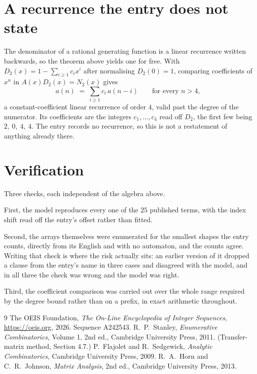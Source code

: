 \documentclass[11pt,a4paper]{article}
\theoremstyle{plain}
\theoremstyle{definition}
\begin{document}
\section{A recurrence the entry does not state}

The denominator of a rational generating function is a linear recurrence written backwards, so
the theorem above yields one for free. With $D_2(x)=1-\sum_{i\ge1}c_ix^i$ after normalising
$D_2(0)=1$, comparing coefficients of $x^n$ in $A(x)D_2(x)=N_2(x)$ gives
\[
a(n)\;=\;\sum_{i\ge1}c_i\,a(n-i)\qquad\text{for every }n>4,
\]
a constant-coefficient linear recurrence of order $4$, valid past the degree of the
numerator. Its coefficients are the integers $c_1,\dots,c_{4}$ read off $D_2$, the first few being $2,\ 0,\ 4,\ 4$. The entry records no recurrence, so this is not a restatement of anything
already there.

\section{Verification}

Three checks, each independent of the algebra above.

First, the model reproduces every one of the $25$ published terms, with the index shift
read off the entry's offset rather than fitted.

Second, the arrays themselves were enumerated for the smallest shapes the entry counts,
directly from its English and with no automaton, and the counts agree. Writing that check is
where the risk actually sits: an earlier version of it dropped a clause from the entry's name
in three cases and disagreed with the model, and in all three the check was wrong and the model
was right.

Third, the coefficient comparison was carried out over the whole range required by the degree
bound rather than on a prefix, in exact arithmetic throughout.

\begin{thebibliography}{9}
 The OEIS Foundation, \emph{The On-Line Encyclopedia of Integer
Sequences}, \url{https://oeis.org}, 2026. Sequence A242543.
 R.~P.~Stanley, \emph{Enumerative Combinatorics}, Volume 1, 2nd ed.,
Cambridge University Press, 2011. (Transfer-matrix method, Section 4.7.)
 P.~Flajolet and R.~Sedgewick, \emph{Analytic Combinatorics}, Cambridge
University Press, 2009.
 R.~A.~Horn and C.~R.~Johnson, \emph{Matrix Analysis}, 2nd ed., Cambridge
University Press, 2013.
\end{thebibliography}
\end{document}
